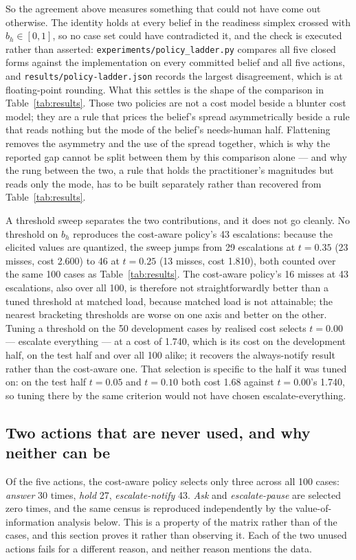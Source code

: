\documentclass{article}
\begin{document}
So the agreement above measures something that could not have come out otherwise.
The identity holds at every belief in the readiness simplex crossed with
$b_h \in [0, 1]$, so no case set could have contradicted it, and the check is
executed rather than asserted: \texttt{experiments/policy\_ladder.py} compares all
five closed forms against the implementation on every committed belief and all five
actions, and \texttt{results/policy-ladder.json} records the largest disagreement,
which is at floating-point rounding. What this settles is the shape of the
comparison in Table~\ref{tab:results}. Those two policies are not a cost model
beside a blunter cost model; they are a rule that prices the belief's spread
asymmetrically beside a rule that reads nothing but the mode of the belief's
needs-human half. Flattening removes the asymmetry and the use of the spread
together, which is why the reported gap cannot be split between them by this
comparison alone --- and why the rung between the two, a rule that holds the
practitioner's magnitudes but reads only the mode, has to be built separately rather
than recovered from Table~\ref{tab:results}.

A threshold sweep separates the two contributions, and it does not go cleanly. No
threshold on $b_h$ reproduces the cost-aware policy's 43 escalations: because the
elicited values are quantized, the sweep jumps from 29 escalations at $t = 0.35$
(23 misses, cost 2.600) to 46 at $t = 0.25$ (13 misses, cost 1.810), both counted
over the same 100 cases as Table~\ref{tab:results}. The
cost-aware policy's 16 misses at 43 escalations, also over all 100, is therefore
not straightforwardly
better than a tuned threshold at matched load, because matched load is not
attainable; the nearest bracketing thresholds are worse on one axis and better on
the other. Tuning a threshold on the 50 development cases by realised cost selects
$t = 0.00$ --- escalate everything --- at a cost of 1.740, which is its cost on
the development half, on the test half and over all 100 alike; it recovers the
always-notify result rather than the cost-aware one. That selection is specific to
the half it was tuned on: on the test half $t = 0.05$ and $t = 0.10$ both cost
1.68 against $t = 0.00$'s 1.740, so tuning there by the same criterion would not
have chosen escalate-everything.

\subsection{Two actions that are never used, and why neither can be}
\label{sec:unused}
Of the five actions, the cost-aware policy selects only three across all 100
cases: \emph{answer} 30 times, \emph{hold} 27, \emph{escalate-notify} 43.
\emph{Ask} and \emph{escalate-pause} are selected zero times, and the same census
is reproduced independently by the value-of-information analysis below. This is a
property of the matrix rather than of the cases, and this section proves it rather
than observing it. Each of the two unused actions fails for a different reason,
and neither reason mentions the data.
\end{document}
